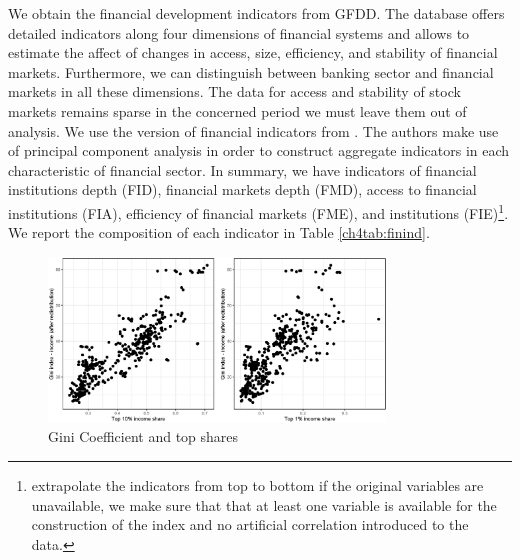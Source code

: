 \begin{refsection}
We obtain the financial development indicators from \ac{GFDD}. The database offers detailed indicators along four dimensions of financial systems and allows to estimate the affect of changes in access, size, efficiency, and stability of financial markets. Furthermore, we can distinguish between banking sector and financial markets in all these dimensions. The data for access and stability of stock markets remains sparse in the concerned period we must leave them out of analysis. We use the version of financial indicators from \textcite{svirydzenka2016introducing}. The authors make use of principal component analysis in order to construct aggregate indicators in each characteristic of financial sector. In summary, we have indicators of financial institutions depth (FID), financial markets depth (FMD), access to financial institutions (FIA), efficiency of financial markets (FME), and institutions (FIE)\footnote{\textcite{svirydzenka2016introducing} extrapolate the indicators from top to bottom if the original variables are unavailable, we make sure that that at least one variable is available for the construction of the index and no artificial correlation introduced to the data.}. We report the composition of each indicator in Table \ref{ch4tab:finind}. 

\begin{figure}[ht!]
  \caption{Gini Coefficient and top shares}
  \label{ch4fig:gini_topshares}
  \centering
  \includegraphics[width=0.8\textwidth, keepaspectratio]{figures/ch4/plots_ineq}
\end{figure}



\end{refsection}
